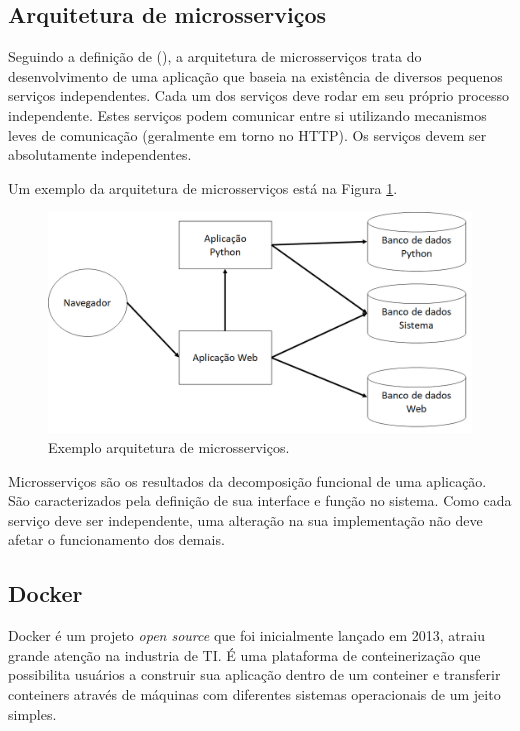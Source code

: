 \subsection{Arquitetura de microsserviços}

Seguindo a definição de \citeauthor{ms1} (\citeyear{ms1}), a arquitetura de microsserviços trata do desenvolvimento de uma aplicação que baseia na existência de diversos pequenos serviços independentes. Cada um dos serviços deve rodar em seu próprio processo independente. Estes serviços podem comunicar entre si utilizando mecanismos leves de comunicação (geralmente em torno no HTTP). Os serviços devem ser absolutamente independentes.

Um exemplo da arquitetura de microsserviços está na Figura \ref{fig:arquitetura-microsservicos}.

\begin{figure}[htbp]
	\centering
	\includegraphics[width=1\linewidth]{figuras/WebService/microservices.png}
	\caption{Exemplo arquitetura de microsserviços.}
	\label{fig:arquitetura-microsservicos}
\end{figure}

Microsserviços são os resultados da decomposição funcional de uma aplicação. São caracterizados pela definição de sua interface e função no sistema. Como cada serviço deve ser independente, uma alteração na sua implementação não deve afetar o funcionamento dos demais. \cite{Pahl}

\subsection{Docker}

Docker é um projeto \textit{open source} que foi inicialmente lançado em 2013, atraiu grande atenção na industria de TI. É uma plataforma de conteinerização que possibilita usuários a construir sua aplicação dentro de um conteiner e transferir conteiners através de máquinas com diferentes sistemas operacionais de um jeito simples. \cite{chang2017kubernetes}

